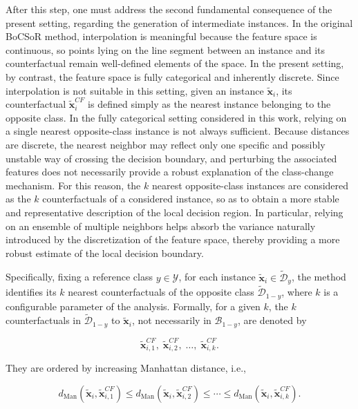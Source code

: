After this step, one must address the second fundamental consequence of the present setting, regarding the generation of intermediate instances. In the original BoCSoR method, interpolation is meaningful because the feature space is continuous, so points lying on the line segment between an instance and its counterfactual remain well-defined elements of the space. In the present setting, by contrast, the feature space is fully categorical and inherently discrete.  Since interpolation is not suitable in this setting, given an instance $\tilde{\mathbf{x}}_i$, its counterfactual $\tilde{\mathbf{x}}^{CF}_i$ is defined simply as the nearest instance belonging to the opposite class.
In the fully categorical setting considered in this work, relying on a single nearest opposite-class instance is not always sufficient. Because distances are discrete, the nearest neighbor may reflect only one specific and possibly unstable way of crossing the decision boundary, and perturbing the associated features does not necessarily provide a robust explanation of the class-change mechanism. For this reason, the $k$ nearest opposite-class instances are considered as the $k$ counterfactuals of a considered instance, so as to obtain a more stable and representative description of the local decision region. In particular, relying on an ensemble of multiple neighbors helps absorb the variance naturally introduced by the discretization of the feature space, thereby providing a more robust estimate of the local decision boundary.

Specifically, fixing a reference class $y \in \mathcal{Y}$, for each instance $\tilde{\mathbf{x}}_i \in \widetilde{\mathcal{D}}_y$, the method identifies its $k$ nearest counterfactuals of the opposite class $\widetilde{\mathcal{D}}_{1-y}$, where $k$ is a configurable parameter of the analysis. Formally, for a given $k$, the $k$ counterfactuals in $\widetilde{\mathcal{D}}_{1-y}$ to $\tilde{\mathbf{x}}_i$, not necessarily in $\mathcal{B}_{1-y}$, are denoted by

\begin{equation}
  \tilde{\mathbf{x}}_{i,1}^{CF},\; \tilde{\mathbf{x}}_{i,2}^{CF},\; \dots,\; \tilde{\mathbf{x}}_{i,k}^{CF}.
\end{equation}

They are ordered by increasing Manhattan distance, i.e.,

\begin{equation}
  d_{\mathrm{Man}}(\tilde{\mathbf{x}}_i, \tilde{\mathbf{x}}_{i,1}^{CF}) \leq d_{\mathrm{Man}}(\tilde{\mathbf{x}}_i, \tilde{\mathbf{x}}_{i,2}^{CF}) \leq \cdots \leq d_{\mathrm{Man}}(\tilde{\mathbf{x}}_i, \tilde{\mathbf{x}}_{i,k}^{CF}).
\end{equation}

